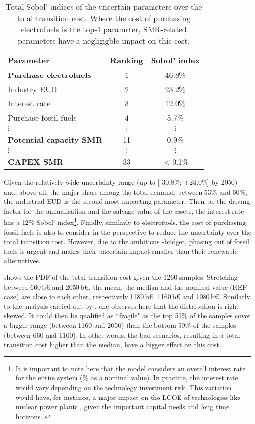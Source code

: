 \begin{table}[htbp!]
\caption{Total Sobol' indices of the uncertain parameters over the total transition cost. Where the cost of purchasing electrofuels is the top-1 parameter, \gls{SMR}-related parameters have a negligigble impact on this cost.}
\label{tab:UQ_short}
\centering
\begin{tabular}{l c c}
\toprule
\textbf{Parameter}  & \textbf{Ranking} & \textbf{Sobol' index} \\	
\midrule
\textbf{Purchase electrofuels} & 1 & 46.8\% \\
Industry EUD & 2 & 23.2\% \\
Interest rate & 3 & 12.0\% \\
Purchase fossil fuels  & 4 & 5.7\% \\
$\vdots$ & $\vdots$ & $\vdots$\\
\textbf{Potential capacity \gls{SMR}} & 11 & 0.9\% \\
$\vdots$ & $\vdots$ & $\vdots$\\
\textbf{CAPEX \gls{SMR}} & 33 & $<$0.1\% \\
\bottomrule							

\end{tabular}
\end{table}

Given the relatively wide uncertainty range (\ie up to [-30.8\%; +24.0\%] by 2050) and, above all, the major share among the total demand, between 53\% and 60\%, the industrial \gls{EUD} is the second most impacting parameter. Then, as the driving factor for the annualisation and the salvage value of the assets, the interest rate has a 12\% Sobol' index\footnote{It is important to note here that the model considers an overall interest rate for the entire system (\% as a nominal value). In practice, the interest rate would vary depending on the technology investment risk. This variation would have, for instance, a major impact on the \gls{LCOE} of technologies like nuclear power plants \cite{world_nuclear_asso}, given the important capital needs and long time horizons \cite{IEA_Nuclear_2022}.}. Finally, similarly to electrofuels, the cost of purchasing fossil fuels is also to consider in the perspective to reduce the uncertainty over the total transition cost. However, due to the ambitious -budget, phasing out of fossil fuels is urgent and makes their uncertain impact smaller than their renewable alternatives.

 shows the \gls{PDF} of the total transition cost given the 1260 samples. Stretching between 660\,b€ and 2050\,b€, the mean, the median and the nominal value (\ie REF case) are close to each other, respectively 1180\,b€, 1160\,b€ and 1080\,b€. Similarly to the analysis carried out by \citet{coppitters2023optimizing}, one observes here that the distribution is right-skewed. It could then be qualified as ``fragile" as the top 50\% of the samples cover a bigger range (\ie between 1160 and 2050) than the bottom 50\% of the samples (\ie between 660 and 1160). In other words, the bad scenarios, resulting in a total transition cost higher than the median, have a bigger effect on this cost.

